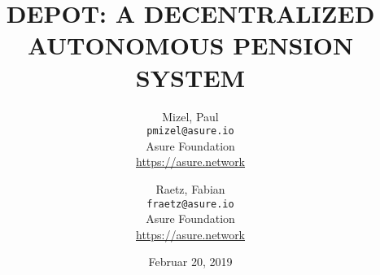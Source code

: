 
\title{DEPOT: A DECENTRALIZED AUTONOMOUS PENSION SYSTEM}
\author{
  Mizel, Paul\\
  \texttt{pmizel@asure.io}\\
  Asure Foundation \\ 
  {\url{https://asure.network}}\\
  \and
  Raetz, Fabian\\
  \texttt{fraetz@asure.io}\\
  Asure Foundation \\ 
  {\url{https://asure.network}}\\
}

\date{Februar 20, 2019}
\maketitle

